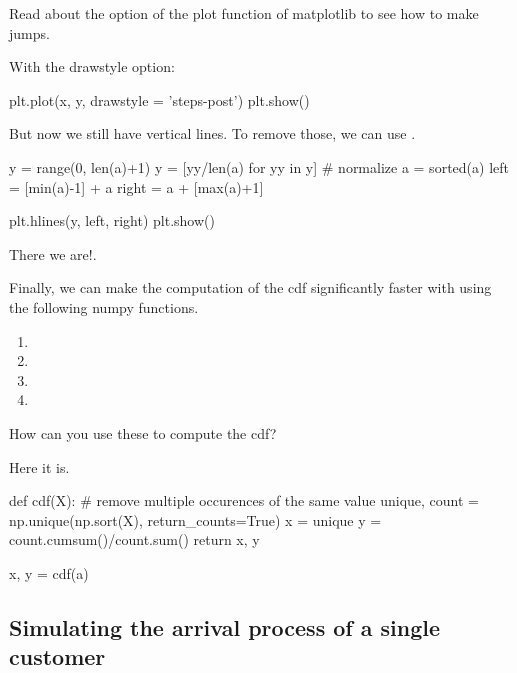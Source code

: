 \documentclass{scrartcl}
\begin{document}
\begin{exercise}
Read about the  option of the plot function of matplotlib to see how to make jumps.
  \begin{solution}
With the drawstyle option: 
\begin{pyblock}
plt.plot(x, y,  drawstyle = 'steps-post')
plt.show()
\end{pyblock}


But now we still have vertical lines. To remove those, we can use .

\begin{pyblock}
y = range(0, len(a)+1)
y = [yy/len(a) for yy in y] # normalize
a = sorted(a)
left = [min(a)-1] + a
right = a + [max(a)+1]

plt.hlines(y, left, right)
plt.show()
\end{pyblock}

There  we are!.
  \end{solution}
\end{exercise}


\begin{exercise}
Finally, we can make the computation of the cdf significantly faster with using the following numpy functions. 
\begin{enumerate}
\item {}
\item {}
\item {}
\item {}
\end{enumerate}
How can you use these to compute the cdf?
\begin{solution}
Here it is.
\begin{pyblock}

def cdf(X):
    # remove multiple occurences of the same value
    unique, count = np.unique(np.sort(X), return_counts=True)
    x = unique
    y = count.cumsum()/count.sum()
    return x, y

x, y = cdf(a)
\end{pyblock}

\end{solution}
\end{exercise}

\subsection{Simulating the arrival process of a single customer}
\label{sec:simulations}
\end{document}
